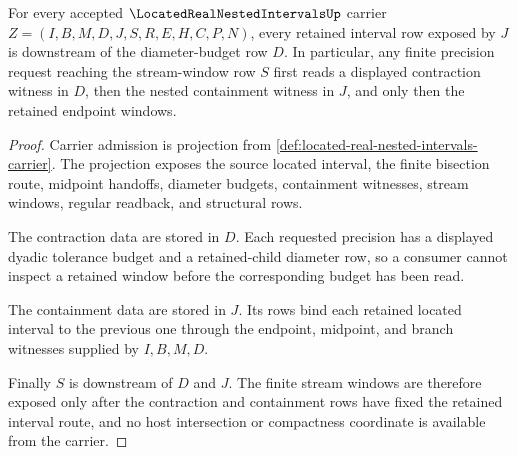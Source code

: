 \begin{theorem}
\label{thm:located-real-nested-intervals-diameter-contracts}
For every accepted $\LocatedRealNestedIntervalsUp$ carrier $Z=(I,B,M,D,J,S,R,E,H,C,P,N)$, every retained interval row exposed by $J$ is downstream of the diameter-budget row $D$. In particular, any finite precision request reaching the stream-window row $S$ first reads a displayed contraction witness in $D$, then the nested containment witness in $J$, and only then the retained endpoint windows.
\end{theorem}
\begin{proof}
Carrier admission is projection from \autoref{def:located-real-nested-intervals-carrier}. The projection exposes the source located interval, the finite bisection route, midpoint handoffs, diameter budgets, containment witnesses, stream windows, regular readback, and structural rows.

The contraction data are stored in $D$. Each requested precision has a displayed dyadic tolerance budget and a retained-child diameter row, so a consumer cannot inspect a retained window before the corresponding budget has been read.

The containment data are stored in $J$. Its rows bind each retained located interval to the previous one through the endpoint, midpoint, and branch witnesses supplied by $I,B,M,D$.

Finally $S$ is downstream of $D$ and $J$. The finite stream windows are therefore exposed only after the contraction and containment rows have fixed the retained interval route, and no host intersection or compactness coordinate is available from the carrier.
\end{proof}

